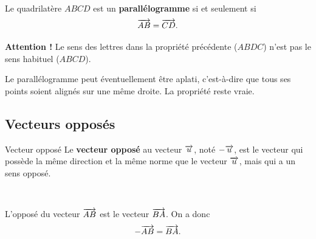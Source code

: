\documentclass[11pt]{article}
\begin{document}
\begin{prop}~\\[-5mm]
  \begin{minipage}[]{.68\textwidth}
  Le quadrilatère $ABCD$ est un \textbf{parallélogramme} si et seulement si
  \[
    \overrightarrow{AB} = \overrightarrow{CD}.
  \]
\end{minipage}\hspace{-6mm}
  \begin{minipage}[]{.32\textwidth}
    \begin{center}
    \end{center}
  \end{minipage}
\end{prop}

\begin{rmq}
  \textbf{Attention !} Le sens des lettres dans la propriété précédente ($ABDC$)
  n'est pas le sens habituel ($ABCD$).
\end{rmq}%
\begin{rmq}
  Le parallélogramme peut éventuellement être aplati, c'est-à-dire que tous ses
  points soient alignés sur une même droite. La propriété reste vraie.
\end{rmq}
\subsection{Vecteurs opposés}
\begin{defi}{Vecteur opposé}
  Le \textbf{vecteur opposé} au vecteur $\overrightarrow{u}$, noté $-\overrightarrow{u}$, est le
  vecteur qui possède la même direction et la même norme que le vecteur $\overrightarrow{u}$, mais qui a un sens opposé.
\end{defi}
\begin{prop}~\\[-2mm]
  \begin{minipage}[]{.6\textwidth}
  L'opposé du vecteur $\overrightarrow{AB}$ est le vecteur $\overrightarrow{BA}$. On a donc
  \[
    -\overrightarrow{AB} = \overrightarrow{BA}.
  \]
  \end{minipage}
  \begin{minipage}[]{.4\textwidth}
    \begin{center}
    \end{center}
  \end{minipage}
\end{prop}
    
\end{document}
